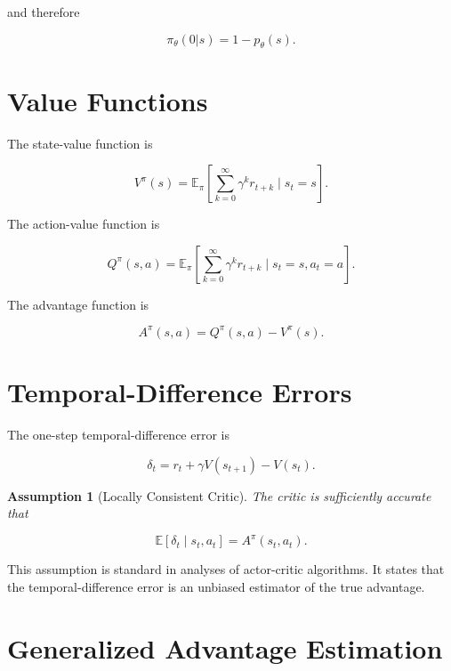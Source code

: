 \documentclass[11pt]{article}
\newtheorem{assumption}{Assumption}
\begin{document}
and therefore

\[
\pi_\theta(0|s)
=
1-p_\theta(s).
\]


\section{Value Functions}

The state-value function is

\[
V^\pi(s)
=
\mathbb E_\pi
\left[
\sum_{k=0}^{\infty}
\gamma^k r_{t+k}
\mid
s_t=s
\right].
\]

The action-value function is

\[
Q^\pi(s,a)
=
\mathbb E_\pi
\left[
\sum_{k=0}^{\infty}
\gamma^k r_{t+k}
\mid
s_t=s,
a_t=a
\right].
\]

The advantage function is

\[
A^\pi(s,a)
=
Q^\pi(s,a)
-
V^\pi(s).
\]


\section{Temporal-Difference Errors}

The one-step temporal-difference error is

\[
\delta_t
=
r_t
+
\gamma
V(s_{t+1})
-
V(s_t).
\]


\begin{assumption}[Locally Consistent Critic]

The critic is sufficiently accurate that

\[
\mathbb E
[
\delta_t
\mid
s_t,a_t
]
=
A^\pi(s_t,a_t).
\]

\end{assumption}

This assumption is standard in analyses of actor-critic algorithms.
It states that the temporal-difference error is an unbiased estimator
of the true advantage.


\section{Generalized Advantage Estimation}
\end{document}
